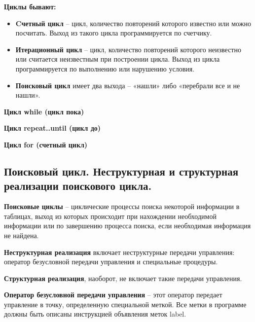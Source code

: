 {\bf{Циклы бывают:}} 
\begin{itemize}
\item {\bf{Cчетный цикл}} – цикл, количество повторений которого известно или можно посчитать. Выход из такого цикла программируется по счетчику.

\item {\bf{Итерационный цикл}} – цикл, количество повторений которого неизвестно или считается неизвестным при построении цикла. 
Выход из цикла программируется по выполнению или нарушению условия.

\item {\bf{Поисковый цикл}} имеет два выхода – «нашли» либо «перебрали все и не нашли».
\end{itemize}

{\bf{Цикл while (цикл пока)}}


{\bf{Цикл repeat..until (цикл до)}}


{\bf{Цикл for (счетный цикл)}}






\newpage\subsection{Поисковый цикл. Неструктурная и структурная реализации поискового цикла. }

\begin{myquote}
\end{myquote}

{\bf{Поисковые циклы}} – циклические процессы поиска некоторой информации в таблицах, выход из которых происходит при нахождении необходимой информации или по завершению процесса поиска, если необходимая информация не найдена.

{\bf{Неструктурная реализация}} включает неструктурные передачи управления: оператор безусловной передачи управления и специальные процедуры.

{\bf{Структурная реализация}}, наоборот, не включает такие передачи управления.

{\bf{Оператор безусловной передачи управления}} – этот оператор передает управление в точку, определенную специальной меткой.
Все метки в программе должны быть описаны инструкцией объявления меток label. 

